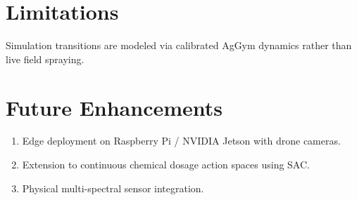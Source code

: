 \documentclass[12pt,a4paper]{report}
\begin{document}
\section{Limitations}
Simulation transitions are modeled via calibrated AgGym dynamics rather than live field spraying.

\section{Future Enhancements}
\begin{enumerate}
    \item Edge deployment on Raspberry Pi / NVIDIA Jetson with drone cameras.
    \item Extension to continuous chemical dosage action spaces using SAC.
    \item Physical multi-spectral sensor integration.
\end{enumerate}
\end{document}
